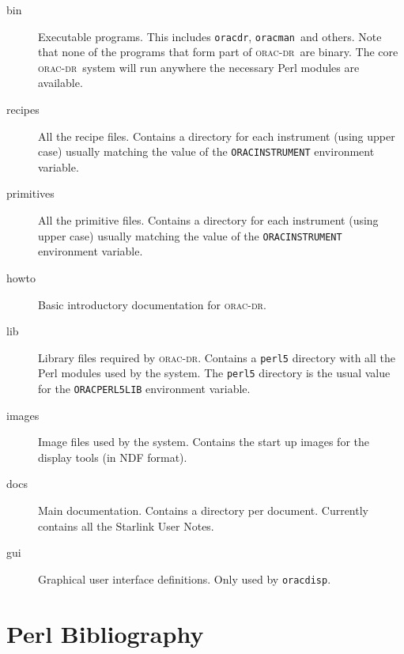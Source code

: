 \documentclass[twoside,11pt]{article}
\renewcommand{\_}{\texttt{\symbol{95}}}
\newcommand{\Oracdr}{\textsc{orac-dr}}
\newcommand{\oracdr}{\texttt{oracdr}}
\newcommand{\oracman}{\texttt{oracman}}
\newcommand{\oracdisp}{\texttt{oracdisp}}
\begin{document}
\begin{description}
\item[bin] \mbox{}

Executable programs. This includes \oracdr, \oracman\ and others. Note
that none of the programs that form part of \Oracdr\ are binary. 
The core \Oracdr\ system will run anywhere the necessary Perl modules
are available.

\item[recipes] \mbox{}

All the recipe files. Contains a directory for each instrument (using
upper case) usually matching the value of the
\texttt{ORAC\_INSTRUMENT} environment variable.

\item[primitives] \mbox{}

All the primitive files. Contains a directory for each instrument
(using upper case) usually matching the value of the
\texttt{ORAC\_INSTRUMENT} environment variable.

\item[howto] \mbox{}

Basic introductory documentation for \Oracdr.

\item[lib] \mbox{}

Library files required by \Oracdr. Contains a \texttt{perl5} directory
with all the Perl modules used by the system. The \texttt{perl5}
directory is the usual value for the \texttt{ORAC\_PERL5LIB}
environment variable.

\item[images] \mbox{}

Image files used by the system. Contains the start up images for the
display tools (in NDF format).

\item[docs] \mbox{}

Main documentation. Contains a directory per document. Currently
contains all the Starlink User Notes.

\item[gui] \mbox{}

Graphical user interface definitions. Only used by \oracdisp.

\end{description}

\section{Perl Bibliography}
\end{document}
